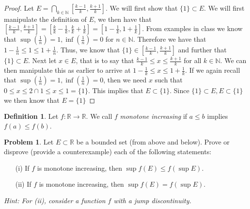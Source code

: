 \documentclass[11pt]{article}
\theoremstyle{definition}
\newtheorem{problem}{Problem}
\newtheorem{definition}{Definition}
\newcommand{\N}{\mathbb{N}}
\newcommand{\R}{\mathbb{R}}
\begin{document}
\begin{proof}
Let $ E = \bigcap_{k \in \N} \left[ \frac{k-1}{k} , \frac{k +1}{k} \right]$. We will first show that $\{1\}\subset E$. We will first manipulate the definition of $E$, we then have that $\left[ \frac{k-1}{k} , \frac{k +1}{k} \right] = \left[ \frac{k}{k}-\frac{1}{k} , \frac{k}{k}+\frac{1}{k} \right] = \left[ 1-\frac{1}{k} , 1+\frac{1}{k} \right]$. From examples in class we know that $\sup(\frac{1}{n})=1,\inf(\frac{1}{n})=0$ for $n\in\N$. Therefore we have that $1-\frac{1}{n} \leq 1 \leq 1+\frac{1}{n}$. Thus, we know that $\{1\}\in\left[ \frac{k-1}{k} , \frac{k +1}{k} \right]$ and further that $\{1\}\subset E.$ Next let $x\in E$, that is to say that $\frac{k-1}{k}\leq x\leq \frac{k+1}{k}$ for all $k\in \N.$ We can then manipulate this as earlier to arrive at $1-\frac{1}{k}\leq x\leq 1+\frac{1}{k}$. If we again recall that $\sup(\frac{1}{n})=1, \inf(\frac{1}{n})=0$, then we need $x$ such that $0\leq x\leq 2 \cap 1\leq x\leq 1 = \{1\}$. This implies that $E \subset \{1\}$. Since $\{1\}\subset E, E\subset\{1\}$ we then know that $E = \{1\}$
\end{proof}

\pagebreak

\begin{definition}
Let $f : \R \to \R$. We call $f$ \emph{monotone increasing} if $a \leq b$ implies $f(a) \leq f(b)$. 
\end{definition}

\begin{problem}
Let $E \subset \R$ be a bounded set (from above and below). Prove or disprove (provide a counterexample) each of the following statements: 
\begin{itemize}
	\item[(i)] If $f$ is monotone increasing, then $\sup f(E) \leq f(\sup E)$.
	\item[(ii)] If $f$ is monotone increasing, then $\sup f(E) = f(\sup E)$. 
\end{itemize}
\end{problem}
\emph{Hint: For (ii), consider a function $f$ with a jump discontinuity. } 
\end{document}
